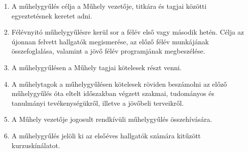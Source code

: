 \documentclass{../styles/rulebook}
\begin{document}
\begin{enumerate}
	\item A műhelygyűlés célja a Műhely vezetője, titkára és tagjai közötti egyeztetésnek keretet adni.
	\item Félévnyitó műhelygyűlésre kerül sor a félév első vagy második hetén. Célja az újonnan felvett hallgatók megismerése, az előző félév munkájának összefoglalása, valamint a jövő félév programjának megbeszélése.
	\item A műhelygyűlésen a Műhely tagjai kötelesek részt venni.
	\item A műhelytagok a műhelygyűlésen kötelesek röviden beszámolni az előző műhelygyűlés óta eltelt időszakban végzett szakmai, tudományos és tanulmányi tevékenységükről, illetve a jövőbeli terveikről.
	\item A Műhely vezetője jogosult rendkívüli műhelygyűlés összehívására.
	\item A műhelygyűlés jelöli ki az elsőéves hallgatók számára kitűzött kurzuskínálatot.
\end{enumerate}
\end{document}
